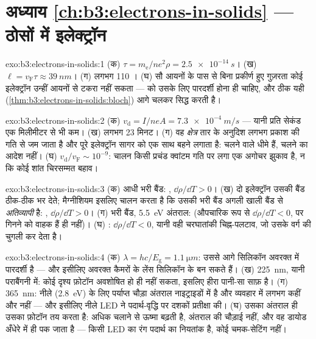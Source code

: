 \section*{अध्याय \ref{ch:b3:electrons-in-solids} --- ठोसों में इलेक्ट्रॉन}

\begin{solution}{exo:b3:electrons-in-solids:1}
(क) $\tau = m_{\text{e}}/ne^2\rho = \qty{2.5e-14}{s}$। (ख) $\ell =
v_{\text{F}}\tau \approx \qty{39}{nm}$। (ग) लगभग 110 । (घ) सौ आयनों के पास से बिना प्रकीर्ण हुए गुज़रता कोई
इलेक्ट्रॉन उन्हीं आयनों से टकरा नहीं सकता ---
 को उसके लिए पारदर्शी होना ही चाहिए, और ठीक यही 
(\cref{thm:b3:electrons-in-solids:bloch}) आगे चलकर सिद्ध करती है।
\end{solution}

\begin{solution}{exo:b3:electrons-in-solids:2}
(क) $v_{\text{d}} = I/neA = \qty{7.3e-4}{m/s}$ --- यानी प्रति सेकंड
एक मिलीमीटर से भी कम। (ख) लगभग 23 मिनट। (ग) वह \emph{क्षेत्र}
तार के अनुदिश लगभग प्रकाश की गति से जम जाता है और पूरे इलेक्ट्रॉन
सागर को एक साथ बहने लगाता है: चलने वाले धीमे हैं,
चलने का आदेश नहीं। (घ) $v_{\text{d}}/v_{\text{F}} \sim
10^{-9}$: चालन किसी प्रचंड क्वांटम गति पर लगा एक अगोचर झुकाव है, न
कि कोई शांत चिरसम्मत बहाव।
\end{solution}

\begin{solution}{exo:b3:electrons-in-solids:3}
(क) आधी भरी बैंड: , $\dd\rho/\dd T > 0$। (ख) दो
इलेक्ट्रॉन उसकी बैंड ठीक-ठीक भर देते; मैग्नीशियम इसलिए चालन करता है
कि उसकी भरी बैंड अगली खाली बैंड से \emph{अतिव्यापी} है: ,
$\dd\rho/\dd T > 0$। (ग) भरी बैंड, \qty{5.5}{eV} अंतराल: 
(औपचारिक रूप से $\dd\rho/\dd T < 0$, पर गिनने को वाहक हैं ही
नहीं)। (घ) : $\dd\rho/\dd T < 0$, यानी वही
चरघातांकी चिह्न-पलटाव, जो उसके वर्ग की चुगली कर देता है।
\end{solution}

\begin{solution}{exo:b3:electrons-in-solids:4}
(क) $\lambda = hc/E_{\text{g}} = \qty{1.1}{\micro m}$: उससे आगे
सिलिकॉन अवरक्त में पारदर्शी है --- और इसीलिए अवरक्त
कैमरों के लेंस सिलिकॉन के बन सकते हैं। (ख) \qty{225}{nm}, यानी
पराबैंगनी में: कोई दृश्य फ़ोटॉन अवशोषित हो ही नहीं सकता, इसलिए हीरा
पानी-सा साफ़ है। (ग) \qty{365}{nm}: नीले (\qty{2.8}{eV}) के लिए
पर्याप्त चौड़ा अंतराल नाइट्राइडों में है और व्यवहार में लगभग कहीं और
नहीं --- और इसीलिए नीले LED ने पदार्थ-वृद्धि पर दशकों प्रतीक्षा की।
(घ) उसका अंतराल ही उसका फ़ोटॉन तय करता है: अधिक चलाने से ऊष्मा बढ़ती
है, अंतराल की चौड़ाई नहीं, और वह डायोड अँधेरे में ही पक जाता है ---
किसी LED का रंग पदार्थ का नियतांक है, कोई चमक-सेटिंग नहीं।
\end{solution}

